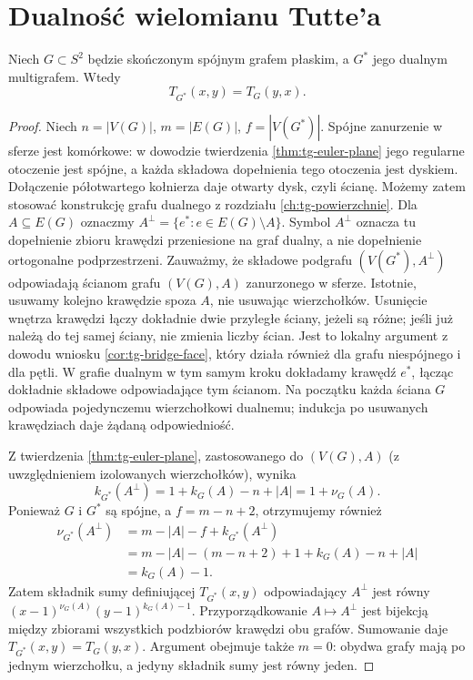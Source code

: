 \section{Dualność wielomianu Tutte'a}
\label{sec:tg-tutte-duality}

\begin{twierdzenie}
\label{thm:tg-tutte-dual}
Niech $G\subset S^2$ będzie skończonym spójnym grafem
płaskim, a $G^*$ jego dualnym multigrafem. Wtedy
\[
 T_{G^*}(x,y)=T_G(y,x).
\]
\end{twierdzenie}

\begin{proof}
Niech $n=|V(G)|$, $m=|E(G)|$, $f=|V(G^*)|$.
Spójne zanurzenie w sferze jest komórkowe:
w dowodzie twierdzenia \ref{thm:tg-euler-plane}
jego regularne otoczenie jest spójne, a każda składowa
dopełnienia tego otoczenia jest dyskiem. Dołączenie
półotwartego kołnierza daje otwarty dysk, czyli ścianę.
Możemy zatem stosować konstrukcję grafu dualnego
z rozdziału \ref{ch:tg-powierzchnie}.
Dla $A\subseteq E(G)$ oznaczmy
$A^\perp=\{e^*:e\in E(G)\setminus A\}$.
Symbol $A^\perp$ oznacza tu dopełnienie zbioru
krawędzi przeniesione na graf dualny, a nie
dopełnienie ortogonalne podprzestrzeni.
Zauważmy, że składowe podgrafu $(V(G^*),A^\perp)$
odpowiadają ścianom grafu $(V(G),A)$ zanurzonego w sferze.
Istotnie, usuwamy kolejno krawędzie spoza $A$, nie usuwając
wierzchołków. Usunięcie wnętrza krawędzi łączy dokładnie
dwie przyległe ściany, jeżeli są różne; jeśli już należą
do tej samej ściany, nie zmienia liczby ścian.
Jest to lokalny argument z dowodu wniosku
\ref{cor:tg-bridge-face}, który działa również dla grafu
niespójnego i dla pętli. W grafie dualnym w tym samym
kroku dokładamy krawędź $e^*$, łącząc dokładnie składowe
odpowiadające tym ścianom. Na początku każda ściana $G$
odpowiada pojedynczemu wierzchołkowi dualnemu; indukcja
po usuwanych krawędziach daje żądaną odpowiedniość.

Z twierdzenia \ref{thm:tg-euler-plane}, zastosowanego
do $(V(G),A)$ (z uwzględnieniem izolowanych wierzchołków),
wynika
\[
 k_{G^*}(A^\perp)=1+k_G(A)-n+|A|=1+\nu_G(A).
\]
Ponieważ $G$ i $G^*$ są spójne, a $f=m-n+2$,
otrzymujemy również
\[
\begin{aligned}
 \nu_{G^*}(A^\perp)
 &=m-|A|-f+k_{G^*}(A^\perp)\\
 &=m-|A|-(m-n+2)+1+k_G(A)-n+|A|\\
 &=k_G(A)-1.
\end{aligned}
\]
Zatem składnik sumy definiującej $T_{G^*}(x,y)$
odpowiadający $A^\perp$ jest równy
$(x-1)^{\nu_G(A)}(y-1)^{k_G(A)-1}$.
Przyporządkowanie $A\mapsto A^\perp$ jest bijekcją
między zbiorami wszystkich podzbiorów krawędzi obu grafów.
Sumowanie daje $T_{G^*}(x,y)=T_G(y,x)$.
Argument obejmuje także $m=0$: obydwa grafy mają po jednym
wierzchołku, a jedyny składnik sumy jest równy jeden.
\end{proof}

